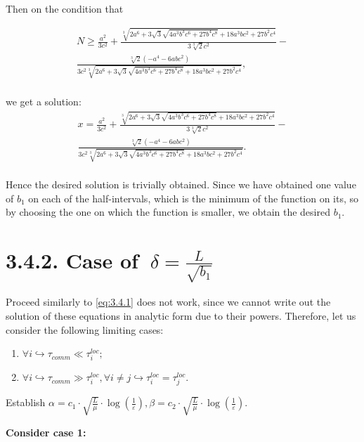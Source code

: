 \documentclass{article}
\theoremstyle{definition}
\theoremstyle{plain}
\begin{document}
Then on the condition that 

\begin{gather*}
    N \geq \frac{a^2}{3 c^2}+\frac{\sqrt[3]{2 a^6+3 \sqrt{3} \sqrt{4 a^3 b^3 c^6+27 b^4 c^8}+18 a^3 b c^2+27 b^2 c^4}}{3 \sqrt[3]{2} c^2}-  \\
    \frac{\sqrt[3]{2}\left(-a^4-6 a b c^2\right) } 
    {3 c^2 \sqrt[3]{2 a^6+3 \sqrt{3} \sqrt{4 a^3 b^3 c^6+27 b^4 c^8}+18 a^3 b c^2+27 b^2 c^4}}, \\
\end{gather*}

we get a solution: \\

\begin{gather*}
     x=\frac{a^2}{3 c^2}+\frac{\sqrt[3]{2 a^6+3 \sqrt{3} \sqrt{4 a^3 b^3 c^6+27 b^4 c^8}+18 a^3 b c^2+27 b^2 c^4}}{3 \sqrt[3]{2} c^2}- \\ \frac{\sqrt[3]{2}\left(-a^4-6 a b c^2\right)} 
    {3 c^2 \sqrt[3]{2 a^6+3 \sqrt{3} \sqrt{4 a^3 b^3 c^6+27 b^4 c^8}+18 a^3 b c^2+27 b^2 c^4}}.  \\
\end{gather*}

Hence the desired solution is trivially obtained. Since we have obtained one value of $b_1$ on each of the half-intervals, which is the minimum of the function on its, so by choosing the one on which the function is smaller, we obtain the desired $b_1$.

\section*{3.4.2. Case of $~\delta = \frac{L}{\sqrt{b_1}}$}\label{eq:3.4.2}
Proceed similarly to \ref{eq:3.4.1} does not work, since we cannot write out the solution of these equations in analytic form due to their powers.
Therefore, let us consider the following limiting cases:
\begin{enumerate}
    \item $\forall i\hookrightarrow \tau_{comm} \ll \tau_i^{loc};$
    \item $\forall i\hookrightarrow \tau_{comm} \gg \tau_i^{loc}, \forall i\neq j\hookrightarrow \tau_i^{loc} = \tau_j^{loc}.$
\end{enumerate}

Establish $\alpha = c_1\cdot\sqrt{\frac{L}{\mu}}\cdot \log(\frac{1}{\varepsilon}),\beta = c_2\cdot\sqrt{\frac{L}{\mu}}\cdot \log(\frac{1}{\varepsilon}) $.

\textbf{Consider case 1:}
\end{document}

